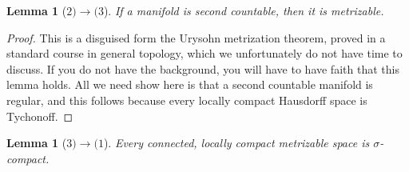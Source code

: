 \documentclass[12pt]{report}
\theoremstyle{plain}
\newtheorem{lemma}[theorem]{Lemma}
\theoremstyle{definition}
\begin{document}
\begin{lemma}[$2) \to (3$]
    If a manifold is second countable, then it is metrizable.
\end{lemma}
\begin{proof}
    This is a disguised form the Urysohn metrization theorem, proved in a standard course in general topology, which we unfortunately do not have time to discuss. If you do not have the background, you will have to have faith that this lemma holds. All we need show here is that a second countable manifold is regular, and this follows because every locally compact Hausdorff space is Tychonoff.
\end{proof}

\begin{lemma}[$3) \to (1$]
    Every connected, locally compact metrizable space is $\sigma$-compact.
\end{lemma}
\end{document}
